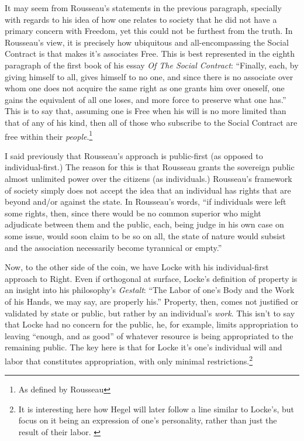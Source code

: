 \documentclass[12pt,letterpaper]{article}
\begin{document}
\begin{spacing}{2}
    It may seem from Rousseau's statements in the previous paragraph, specially
    with regards to his idea of how one relates to society that he did not have
    a primary concern with Freedom, yet this could not be furthest from the
    truth. In Rousseau's view, it is precisely how ubiquitous and
    all-encompassing the Social Contract is that makes it's associates Free.
    This is best represented in the eighth paragraph of the first book of his
    essay \textit{Of The Social Contract}: ``Finally, each, by giving himself to
    all, gives himself to no one, and since there is no associate over whom one
    does not acquire the same right as one grants him over oneself, one gains
    the equivalent of all one loses, and more force to preserve what one
    has.''\autocite[p.~50]{rousseau-1997} This is to say that, assuming one is
    Free when his will is no more limited than that of any of his kind, then all
    of those who subscribe to the Social Contract are free within their
    \textit{people}.\footnote{As defined by Rousseau}

    I said previously that Rousseau's approach is public-first (as opposed to
    individual-first.) The reason for this is that Rousseau grants the sovereign
    public almost unlimited power over the citizens (as individuals.) Rousseau's
    framework of society simply does not accept the idea that an individual has
    rights that are beyond and/or against the
    state.\autocite[pp.~78--79]{perry-bock-2012} In Rousseau's words, ``if
    individuals were left some rights, then, since there would be no common
    superior who might adjudicate between them and the public, each, being
    judge in his own case on some issue, would soon claim to be so on all,
    the state of nature would subsist and the association necessarily become
    tyrannical or empty.''\autocite[p.~50]{rousseau-1997}

    Now, to the other side of the coin, we have Locke with his
    individual-first approach to Right. Even if orthogonal at surface, Locke's
    definition of property is an insight into his philosophy's \textit{Gestalt}:
    ``The Labor of one's Body and the Work of his Hands, we may say, are
    properly his.''\autocite[p.~287]{locke-1988} Property, then, comes not
    justified or validated by state or public, but rather by an individual's
    \textit{work}. This isn't to say that Locke had no concern for the public,
    he, for example,  limits appropriation to leaving ``enough, and as
    good''\autocite[p.~291]{locke-1988} of whatever resource is being
    appropriated to the remaining public. The key here is that for Locke it's
    one's individual will and labor that constitutes appropriation, with only
    minimal restrictions.\footnote{It is interesting here how Hegel will later
    follow a line similar to Locke's, but focus on it being an expression of
    one's personality, rather than just the result of their
    labor. \autocite[pp.~84--88]{hegel-1991}}


\end{spacing}
\end{document}
